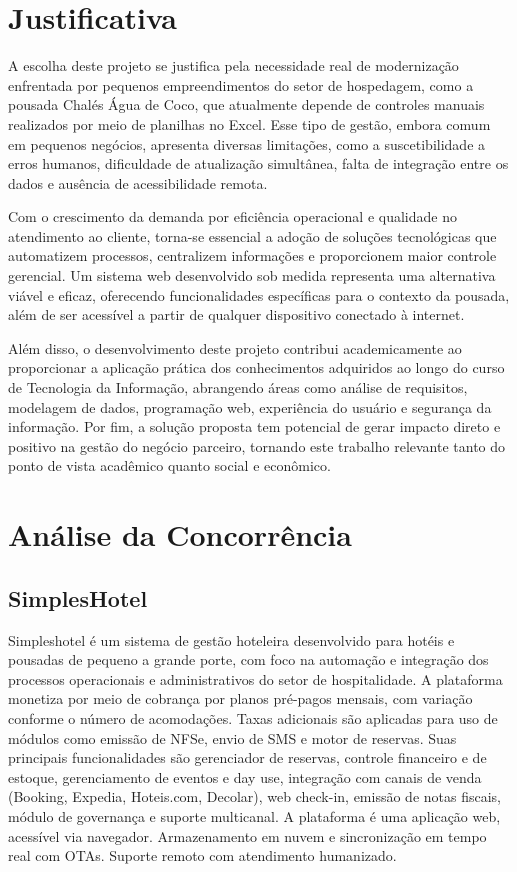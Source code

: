 \documentclass[
	12pt,				%
	openany,			%
	twoside,			%
	a4paper,			%
	english,			%
	french,				%
	spanish,			%
	brazil				%
	]{abntex2}
\begin{document}
\section{Justificativa}
A escolha deste projeto se justifica pela necessidade real de modernização enfrentada por pequenos empreendimentos do setor de hospedagem, como a pousada Chalés Água de Coco, que atualmente depende de controles manuais realizados por meio de planilhas no Excel. Esse tipo de gestão, embora comum em pequenos negócios, apresenta diversas limitações, como a suscetibilidade a erros humanos, dificuldade de atualização simultânea, falta de integração entre os dados e ausência de acessibilidade remota.

Com o crescimento da demanda por eficiência operacional e qualidade no atendimento ao cliente, torna-se essencial a adoção de soluções tecnológicas que automatizem processos, centralizem informações e proporcionem maior controle gerencial. Um sistema web desenvolvido sob medida representa uma alternativa viável e eficaz, oferecendo funcionalidades específicas para o contexto da pousada, além de ser acessível a partir de qualquer dispositivo conectado à internet.

Além disso, o desenvolvimento deste projeto contribui academicamente ao proporcionar a aplicação prática dos conhecimentos adquiridos ao longo do curso de Tecnologia da Informação, abrangendo áreas como análise de requisitos, modelagem de dados, programação web, experiência do usuário e segurança da informação. Por fim, a solução proposta tem potencial de gerar impacto direto e positivo na gestão do negócio parceiro, tornando este trabalho relevante tanto do ponto de vista acadêmico quanto social e econômico.

\section{Análise da Concorrência}
\subsection{SimplesHotel}
Simpleshotel é um sistema de gestão hoteleira desenvolvido para hotéis e pousadas de pequeno a grande porte, com foco na automação e integração dos processos operacionais e administrativos do setor de hospitalidade.
A plataforma monetiza por meio de cobrança por planos pré-pagos mensais, com variação conforme o número de acomodações. Taxas adicionais são aplicadas para uso de módulos como emissão de NFSe, envio de SMS e motor de reservas.
Suas principais funcionalidades são gerenciador de reservas, controle financeiro e de estoque, gerenciamento de eventos e day use, integração com canais de venda (Booking, Expedia, Hoteis.com, Decolar), web check-in, emissão de notas fiscais, módulo de governança e suporte multicanal.
A plataforma é uma aplicação web, acessível via navegador. Armazenamento em nuvem e sincronização em tempo real com OTAs. Suporte remoto com atendimento humanizado.
\end{document}
